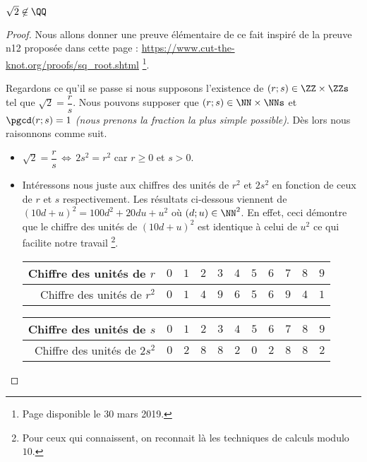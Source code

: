 \begin{fact} \label{sqrt-2-not-in-Q}
	$\sqrt2 \not\in \QQ$
\end{fact}

\begin{proof}
	Nous allons donner une preuve élémentaire de ce fait inspiré de la preuve n\textdegree{}12 proposée dans cette page : \url{https://www.cut-the-knot.org/proofs/sq_root.shtml} 
	\footnote{
		Page disponible le 30 mars 2019.
	}.
	
	\medskip
	
	Regardons ce qu'il se passe si nous supposons l'existence de $(r ; s) \in \ZZ \times \ZZs$ tel que $\sqrt2 = \dfrac{r}{s}$. Nous pouvons supposer que $(r ; s) \in \NN \times \NNs$ et $\pgcd(r ; s) = 1$ \emph{(nous prenons la fraction la plus simple possible)}.
	Dès lors nous raisonnons comme suit.
	
	\begin{itemize}[label=\small\textbullet]
		\item $\sqrt2 = \dfrac{r}{s} \, \Leftrightarrow \, 2 s^2 = r^2$ car $r \geq 0$ et $s > 0$.


		\item Intéressons nous juste aux chiffres des unités de $r^2$ et $2s^2$ en fonction de ceux de $r$ et $s$ respectivement. Les résultats ci-dessous viennent de $(10d + u)^2 = 100d^2 + 20du + u^2$ où $(d ; u) \in \NN^2$.
		En effet, ceci démontre que le chiffre des unités de $(10d + u)^2$ est identique à celui de $u^2$ ce qui facilite notre travail
		\footnote{
			Pour ceux qui connaissent, on reconnait là les techniques de calculs modulo $10$.
		}.
		\begin{center}
			\begin{tabular}{|r|c|c|c|c|c|c|c|c|c|c|}
				\hline
				Chiffre des unités de $r$
				  & $0$  &  $1$  &  $2$  &  $3$  &  $4$  &  $5$  &  $6$  &  $7$  &  $8$  &  $9$
				\\ \hline
				\phantom{$2$}Chiffre des unités de $r^2$
				  & $0$  &  $1$  &  $4$  &  $9$  &  $6$  &  $5$  &  $6$  &  $9$  &  $4$  &  $1$
				\\ \hline
			\end{tabular}

			\medskip
			
			\begin{tabular}{|r|c|c|c|c|c|c|c|c|c|c|}
				\hline
				Chiffre des unités de $s$
				  & $0$  &  $1$  &  $2$  &  $3$  &  $4$  &  $5$  &  $6$  &  $7$  &  $8$  &  $9$
				\\ \hline
				Chiffre des unités de $2s^2$
				  & $0$  &  $2$  &  $8$  &  $8$  &  $2$  &  $0$  &  $2$  &  $8$  &  $8$  &  $2$
				\\ \hline
			\end{tabular}
		\end{center}



\end{itemize}
\end{proof}
